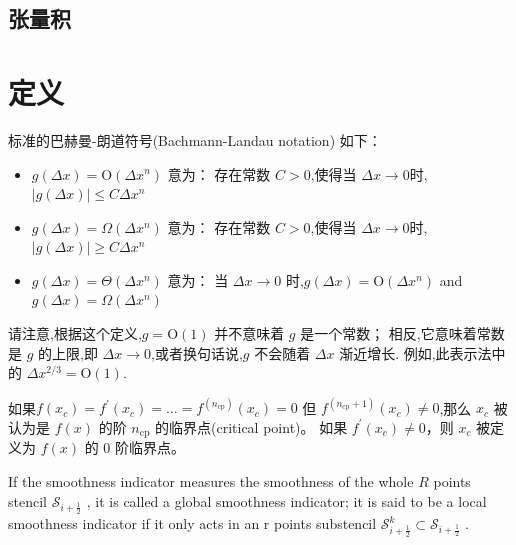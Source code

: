 \documentclass{book}
\begin{document}
\subsection{张量积}


\section{定义}
\begin{definition}
    标准的巴赫曼-朗道符号(Bachmann-Landau notation) 如下：

    \begin{itemize}
        \item $g(\Delta x)=\mathrm{O}\left(\Delta x^{n}\right)$  意为： 存在常数 $C>0$,使得当 $\Delta x \rightarrow 0$时,$|g(\Delta x)| \leq C \Delta x^{n}$
        \item $g(\Delta x)=\Omega\left(\Delta x^{n}\right)$ 意为：  存在常数 $C>0$,使得当 $\Delta x \rightarrow 0$时,$|g(\Delta x)| \geq C \Delta x^{n}$
        \item $g(\Delta x)=\Theta\left(\Delta x^{n}\right)$  意为： 当 $\Delta x \rightarrow 0$ 时,$g(\Delta x)=\mathrm{O}\left(\Delta x^{n}\right)$  and  $g(\Delta x)=\Omega\left(\Delta x^{n}\right)$
    \end{itemize}

    请注意,根据这个定义,$g=\mathrm{O}(1)$ 并不意味着 $g$ 是一个常数； 相反,它意味着常数是 $g$ 的上限,即 $\Delta x \rightarrow 0$,或者换句话说,$g$ 不会随着 $\Delta x$ 渐近增长. 例如,此表示法中的 $\Delta x^{2 / 3}=\mathrm{O}(1)$.
\end{definition}
\begin{definition}
    如果$f\left(x_{c}\right)=f^{\prime}\left(x_{c}\right)=\ldots=f^{\left(n_{\mathrm{cp}}\right) }\left(x_{c}\right)=0$ 但 $f^{\left(n_{\mathrm{cp}}+1\right)}\left(x_{c}\right) \neq 0$,那么 $x_{c}$ 被认为是 $f(x)$ 的阶 $n_{\mathrm{cp}}$ 的临界点(critical point)。 如果 $f^{\prime}\left(x_{c}\right) \neq 0$，则 $x_{c}$ 被定义为 $f(x)$ 的 0 阶临界点。
\end{definition}
\begin{definition}
    \cite{WENO-Z-2016}
    If the smoothness indicator measures the smoothness of the whole  $R$  points stencil  $\mathcal{S}_{i+\frac{1}{2}}$ , it is called a global smoothness indicator; it is said to be a local smoothness indicator if it only acts in an  r  points substencil  $\mathcal{S}_{i+\frac{1}{2}}^{k} \subset \mathcal{S}_{i+\frac{1}{2}}$ .
\end{definition}
\end{document}
